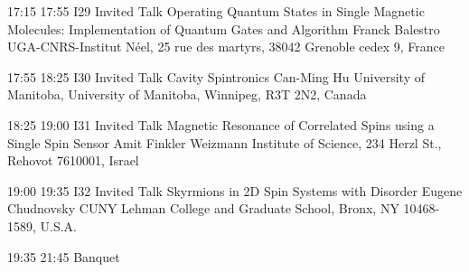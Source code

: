  

\begin{talk}
{17:15}
{17:55}
{I29}
{Invited Talk}
{Operating Quantum States in Single Magnetic Molecules: Implementation of Quantum Gates and Algorithm}
{Franck Balestro}
{UGA-CNRS-Institut Néel, 25 rue des martyrs, 38042 Grenoble cedex 9, France}
\end{talk}

\begin{talk}
{17:55}
{18:25}
{I30}
{Invited Talk}
{Cavity Spintronics}
{Can-Ming Hu}
{University of Manitoba, University of Manitoba, Winnipeg, R3T 2N2, Canada}
\end{talk}

\begin{talk}
{18:25}
{19:00}
{I31}
{Invited Talk}
{Magnetic Resonance of Correlated Spins using a Single Spin Sensor}
{Amit Finkler}
{Weizmann Institute of Science, 234 Herzl St., Rehovot 7610001, Israel}
\end{talk}

\begin{talk}
{19:00}
{19:35}
{I32}
{Invited Talk}
{Skyrmions in 2D Spin Systems with Disorder}
{Eugene Chudnovsky}
{CUNY Lehman College and Graduate School, Bronx, NY 10468-1589, U.S.A.}
\end{talk}

\begin{confbreak}
{19:35}
{21:45}
{Banquet}
\end{confbreak}

